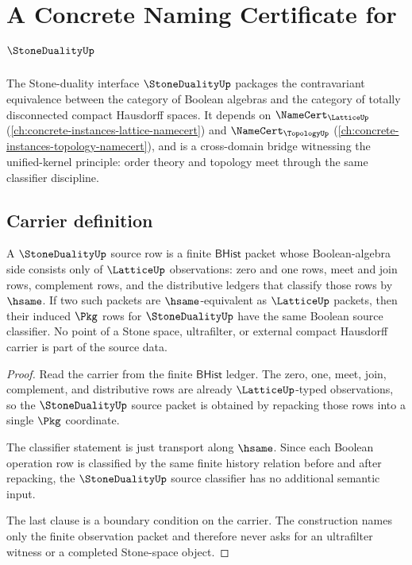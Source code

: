 \chapter{A Concrete Naming Certificate for $\StoneDualityUp$}
\label{ch:concrete-instances-stoneduality-namecert}

The Stone-duality interface $\StoneDualityUp$ packages the contravariant equivalence between the category of Boolean algebras and the category of totally disconnected compact Hausdorff spaces. It depends on $\NameCert_{\LatticeUp}$ (\autoref{ch:concrete-instances-lattice-namecert}) and $\NameCert_{\TopologyUp}$ (\autoref{ch:concrete-instances-topology-namecert}), and is a cross-domain bridge witnessing the unified-kernel principle: order theory and topology meet through the same classifier discipline.

\section{Carrier definition}
\label{sec:stoneduality-carrier}

\begin{theorem}\label{thm:stoneduality-boolean-algebra-source}
A $\StoneDualityUp$ source row is a finite $\mathsf{BHist}$ packet whose Boolean-algebra side consists only of $\LatticeUp$ observations: zero and one rows, meet and join rows, complement rows, and the distributive ledgers that classify those rows by $\hsame$. If two such packets are $\hsame$-equivalent as $\LatticeUp$ packets, then their induced $\Pkg$ rows for $\StoneDualityUp$ have the same Boolean source classifier. No point of a Stone space, ultrafilter, or external compact Hausdorff carrier is part of the source data.
\end{theorem}

\begin{proof}
Read the carrier from the finite $\mathsf{BHist}$ ledger. The zero, one, meet, join, complement, and distributive rows are already $\LatticeUp$-typed observations, so the $\StoneDualityUp$ source packet is obtained by repacking those rows into a single $\Pkg$ coordinate.

The classifier statement is just transport along $\hsame$. Since each Boolean operation row is classified by the same finite history relation before and after repacking, the $\StoneDualityUp$ source classifier has no additional semantic input.

The last clause is a boundary condition on the carrier. The construction names only the finite observation packet and therefore never asks for an ultrafilter witness or a completed Stone-space object.
\end{proof}

